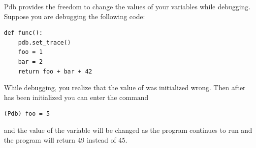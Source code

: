 \begin{info}
Pdb provides the freedom to change the values of your variables while debugging.
Suppose you are debugging the following code:

\begin{lstlisting}
def func():
    pdb.set_trace()
    foo = 1
    bar = 2
    return foo + bar + 42
\end{lstlisting}

While debugging, you realize that the value of  was initialized wrong.
Then after  has been initialized you can enter the command

\begin{lstlisting}
(Pdb) foo = 5
\end{lstlisting}
and the value of the variable will be changed as the program continues to run and the program will return 49 instead of 45.
\end{info}
